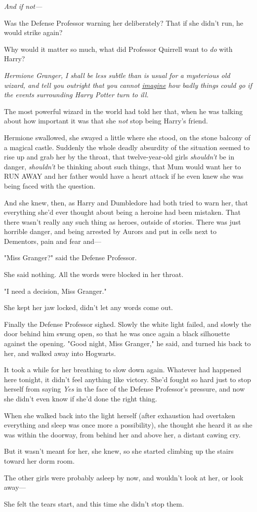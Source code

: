 \emph{And if not---}

Was the Defense Professor warning her deliberately? That if she didn't run, he 
would strike again?

Why would it matter so much, what did Professor Quirrell want to \emph{do} with 
Harry?

\emph{Hermione Granger, I shall be less subtle than is usual for a mysterious 
old wizard, and tell you outright that you cannot \underline{imagine} how badly 
things could go if the events surrounding Harry Potter turn to ill.}

The most powerful wizard in the world had told her that, when he was talking 
about how important it was that she \emph{not} stop being Harry's friend.

Hermione swallowed, she swayed a little where she stood, on the stone balcony 
of a magical castle. Suddenly the whole deadly absurdity of the situation 
seemed to rise up and grab her by the throat, that twelve-year-old girls 
\emph{shouldn't} be in danger, \emph{shouldn't} be thinking about such things, 
that Mum would want her to RUN AWAY and her father would have a heart attack if 
he even knew she was being faced with the question.

And she knew, then, as Harry and Dumbledore had both tried to warn her, that 
everything she'd ever thought about being a heroine had been mistaken. That 
there wasn't really any such thing as heroes, outside of stories. There was 
just horrible danger, and being arrested by Aurors and put in cells next to 
Dementors, pain and fear and---

"Miss Granger?" said the Defense Professor.

She said nothing. All the words were blocked in her throat.

"I need a decision, Miss Granger."

She kept her jaw locked, didn't let any words come out.

Finally the Defense Professor sighed. Slowly the white light failed, and slowly 
the door behind him swung open, so that he was once again a black silhouette 
against the opening. "Good night, Miss Granger," he said, and turned his back 
to her, and walked away into Hogwarts.

It took a while for her breathing to slow down again. Whatever had happened 
here tonight, it didn't feel anything like victory. She'd fought so hard just 
to stop herself from saying \emph{Yes} in the face of the Defense Professor's 
pressure, and now she didn't even know if she'd done the right thing.

When she walked back into the light herself (after exhaustion had overtaken 
everything and sleep was once more a possibility), she thought she heard it as 
she was within the doorway, from behind her and above her, a distant cawing cry.

But it wasn't meant for her, she knew, so she started climbing up the stairs 
toward her dorm room.

The other girls were probably asleep by now, and wouldn't look at her, or look 
away---

She felt the tears start, and this time she didn't stop them.
